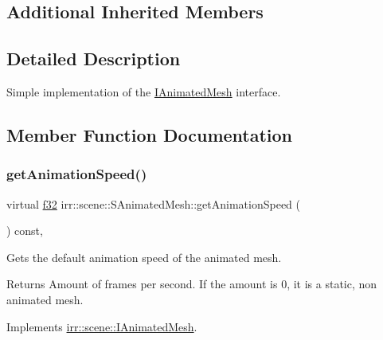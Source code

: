\subsection*{Additional Inherited Members}


\subsection{Detailed Description}
Simple implementation of the \hyperlink{classirr_1_1scene_1_1IAnimatedMesh}{I\+Animated\+Mesh} interface. 

\subsection{Member Function Documentation}
\mbox{\label{structirr_1_1scene_1_1SAnimatedMesh_aa6b6302dad72761e22ba10cc4486b4c8}} 
\subsubsection{\texorpdfstring{get\+Animation\+Speed()}{getAnimationSpeed()}}
{\footnotesize\ttfamily virtual \hyperlink{namespaceirr_a0277be98d67dc26ff93b1a6a1d086b07}{f32} irr\+::scene\+::\+S\+Animated\+Mesh\+::get\+Animation\+Speed (\begin{DoxyParamCaption}{ }\end{DoxyParamCaption}) const\hspace{0.3cm}{\ttfamily [inline]}, {\ttfamily [virtual]}}



Gets the default animation speed of the animated mesh. 

\begin{DoxyReturn}{Returns}
Amount of frames per second. If the amount is 0, it is a static, non animated mesh. 
\end{DoxyReturn}


Implements \hyperlink{classirr_1_1scene_1_1IAnimatedMesh_acb4249295319c8240d5bedc167417435}{irr\+::scene\+::\+I\+Animated\+Mesh}.

\mbox{\label{structirr_1_1scene_1_1SAnimatedMesh_a1494406ce8f11d47fd1e3b4af825e88f}} 
